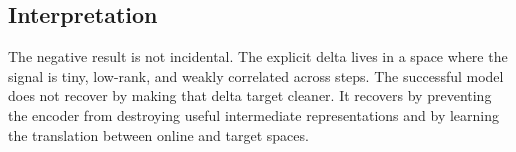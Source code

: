 \subsection{Interpretation}

The negative result is not incidental.  The explicit delta lives in a
space where the signal is tiny, low-rank, and weakly correlated across
steps.  The successful model does not recover by making that delta target
cleaner.  It recovers by preventing the encoder from destroying useful
intermediate representations and by learning the translation between
online and target spaces.
